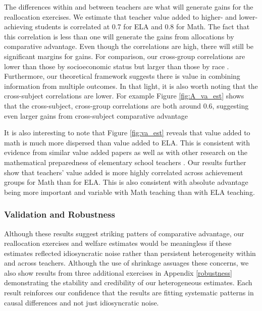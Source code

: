 \documentclass[12pt]{article}
\theoremstyle{definition}
\theoremstyle{definition}
\theoremstyle{definition}
\theoremstyle{definition}
\begin{document}
The differences within and between teachers are what will generate gains for the reallocation exercises. We estimate that teacher value added to higher- and lower-achieving students is correlated at 0.7 for ELA and 0.8 for Math. The fact that this correlation is less than one will generate the gains from allocations by comparative advantage. Even though the correlations are high, there will still be significant margins for gains. For comparison, our cross-group correlations are lower than those by socioeconomic status \citep [0.9 for math in][]{bates2022teacher} but larger than those by race \citep[0.7 for math and 0.4 for ELA in][]{Delgado2020}. Furthermore, our theoretical framework suggests there is value in combining information from multiple outcomes. In that light, it is also worth noting that the cross-subject correlations are lower. For example Figure \ref{fig:A_va_est} shows that the cross-subject, cross-group correlations are both around 0.6, suggesting even larger gains from cross-subject comparative advantage

It is also interesting to note that Figure \ref{fig:va_est} reveals that value added to math is much more dispersed than value added to ELA. This is consistent with evidence from similar value added papers \citep[e.g.,][]{chetty2014measuring1} as well as with other research on the mathematical preparedness of elementary school teachers \citep{?,?,?}. Our results further show that teachers' value added is more highly correlated across achievement groups for Math than for ELA. This is also consistent with absolute advantage being more important and variable with Math teaching than with ELA teaching.



\subsubsection{Validation and Robustness}
Although these results suggest striking patters of comparative advantage, our reallocation exercises and welfare estimates would be meaningless if these estimates reflected idiosyncratic noise rather than persistent heterogeneity within and across teachers. Although the use of shrinkage assuages these concerns, we also show results from three additional exercises in Appendix \ref{robustness} demonstrating the stability and credibility of our heterogeneous estimates. Each result reinforces our confidence that the results are fitting systematic patterns in causal differences and not just idiosyncratic noise.
\end{document}

